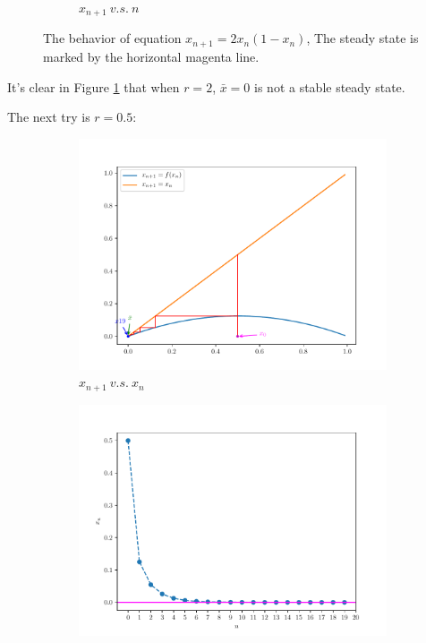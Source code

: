 \begin{homeworkProblem}[2]
\begin{enumerate}
\begin{figure}[h]
\begin{subfigure}[t]{0.4\linewidth}
        \caption{$x_{n+1}\ v.s.\ n$}
    \end{subfigure}
    \caption[The behavior of equation $x_{n+1} = 2x_n(1-x_n)$]{
    The behavior of equation $x_{n+1} = 2x_n(1-x_n)$,
    The steady state is marked by the horizontal magenta line.}
    \label{fig:fig2a1}
\end{figure}

It's clear in Figure \ref{fig:fig2a1} that when $r=2$, $\bar x = 0$ is not a
stable steady state.

The next try is $r=0.5$:
\begin{figure}[h]
    \centering
    \begin{subfigure}[t]{0.4\linewidth}
        \centering
        \includegraphics[scale=0.5]{fig/fig2(a)(2)_cob.pdf}
        \caption{$x_{n+1}\ v.s.\ x_n$}
    \end{subfigure}
    \hfill
    \begin{subfigure}[t]{0.4\linewidth}
        \centering
        \includegraphics[scale=0.5]{../fig/fig2(a)(2).pdf}

\end{subfigure}
\end{figure}
\end{enumerate}
\end{homeworkProblem}
